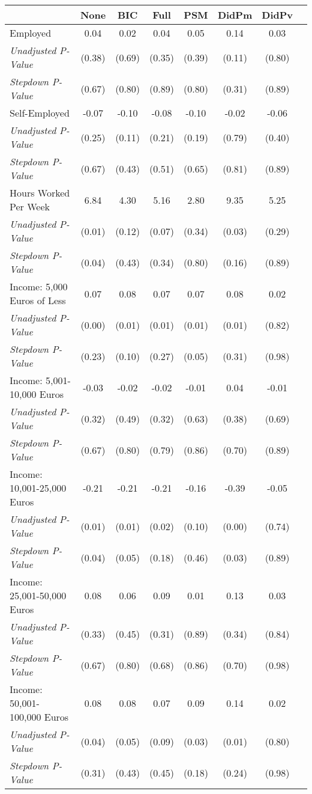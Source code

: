 \begin{tabular}{l c c c c c c c}
\toprule
 & None & BIC & Full & PSM & DidPm & DidPv \\
\midrule
Employed & 0.04 & 0.02 & 0.04 & 0.05 & 0.14 & 0.03 \\
\quad \textit{Unadjusted P-Value} & (0.38) & (0.69) & (0.35) & (0.39) & (0.11) & (0.80) \\
\quad \textit{Stepdown P-Value} & (0.67) & (0.80) & (0.89) & (0.80) & (0.31) & (0.89) \\
Self-Employed & -0.07 & -0.10 & -0.08 & -0.10 & -0.02 & -0.06 \\
\quad \textit{Unadjusted P-Value} & (0.25) & (0.11) & (0.21) & (0.19) & (0.79) & (0.40) \\
\quad \textit{Stepdown P-Value} & (0.67) & (0.43) & (0.51) & (0.65) & (0.81) & (0.89) \\
Hours Worked Per Week & 6.84 & 4.30 & 5.16 & 2.80 & 9.35 & 5.25 \\
\quad \textit{Unadjusted P-Value} & (0.01) & (0.12) & (0.07) & (0.34) & (0.03) & (0.29) \\
\quad \textit{Stepdown P-Value} & (0.04) & (0.43) & (0.34) & (0.80) & (0.16) & (0.89) \\
Income: 5,000 Euros of Less & 0.07 & 0.08 & 0.07 & 0.07 & 0.08 & 0.02 \\
\quad \textit{Unadjusted P-Value} & (0.00) & (0.01) & (0.01) & (0.01) & (0.01) & (0.82) \\
\quad \textit{Stepdown P-Value} & (0.23) & (0.10) & (0.27) & (0.05) & (0.31) & (0.98) \\
Income: 5,001-10,000 Euros & -0.03 & -0.02 & -0.02 & -0.01 & 0.04 & -0.01 \\
\quad \textit{Unadjusted P-Value} & (0.32) & (0.49) & (0.32) & (0.63) & (0.38) & (0.69) \\
\quad \textit{Stepdown P-Value} & (0.67) & (0.80) & (0.79) & (0.86) & (0.70) & (0.89) \\
Income: 10,001-25,000 Euros & -0.21 & -0.21 & -0.21 & -0.16 & -0.39 & -0.05 \\
\quad \textit{Unadjusted P-Value} & (0.01) & (0.01) & (0.02) & (0.10) & (0.00) & (0.74) \\
\quad \textit{Stepdown P-Value} & (0.04) & (0.05) & (0.18) & (0.46) & (0.03) & (0.89) \\
Income: 25,001-50,000 Euros & 0.08 & 0.06 & 0.09 & 0.01 & 0.13 & 0.03 \\
\quad \textit{Unadjusted P-Value} & (0.33) & (0.45) & (0.31) & (0.89) & (0.34) & (0.84) \\
\quad \textit{Stepdown P-Value} & (0.67) & (0.80) & (0.68) & (0.86) & (0.70) & (0.98) \\
Income: 50,001-100,000 Euros & 0.08 & 0.08 & 0.07 & 0.09 & 0.14 & 0.02 \\
\quad \textit{Unadjusted P-Value} & (0.04) & (0.05) & (0.09) & (0.03) & (0.01) & (0.80) \\
\quad \textit{Stepdown P-Value} & (0.31) & (0.43) & (0.45) & (0.18) & (0.24) & (0.98) \\
\bottomrule
\end{tabular}
